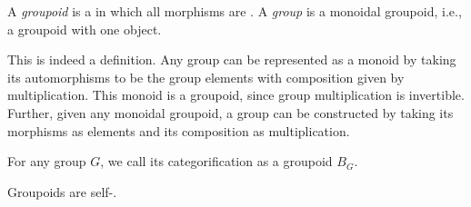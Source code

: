 


\begin{dfn*}\label{cat:groupoid}
	A \emph{groupoid} is a  in which all morphisms are
	. A \emph{group} is a monoidal groupoid, i.e., a
	groupoid with one object.
\end{dfn*}

This is indeed a definition. Any group can be represented as a monoid by taking
its automorphisms to be the group elements with composition given by
multiplication. This monoid is a groupoid, since group multiplication is
invertible. Further, given any monoidal groupoid, a group can be constructed by
taking its morphisms as elements and its composition as multiplication.

For any group $G$, we call its categorification as a groupoid $B_G$.

Groupoids are self-.


